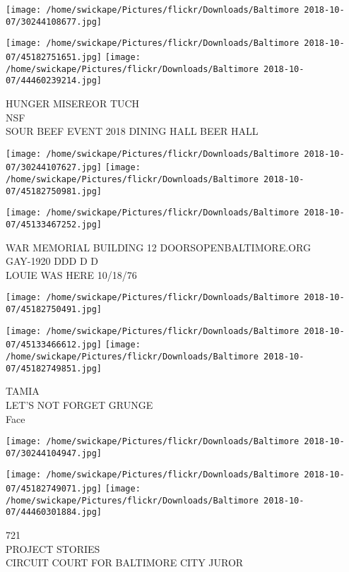 \documentclass[10pt,letterpaper]{article}
\begin{document}
\texttt{[image: /home/swickape/Pictures/flickr/Downloads/Baltimore 2018-10-07/30244108677.jpg]}

\vspace{0.25in}
\texttt{[image: /home/swickape/Pictures/flickr/Downloads/Baltimore 2018-10-07/45182751651.jpg]}
\texttt{[image: /home/swickape/Pictures/flickr/Downloads/Baltimore 2018-10-07/44460239214.jpg]}

HUNGER MISEREOR TUCH\\
NSF\\
SOUR BEEF EVENT 2018 DINING HALL BEER HALL\\
\pagebreak

\texttt{[image: /home/swickape/Pictures/flickr/Downloads/Baltimore 2018-10-07/30244107627.jpg]}
\texttt{[image: /home/swickape/Pictures/flickr/Downloads/Baltimore 2018-10-07/45182750981.jpg]}

\texttt{[image: /home/swickape/Pictures/flickr/Downloads/Baltimore 2018-10-07/45133467252.jpg]}

WAR MEMORIAL BUILDING 12 DOORSOPENBALTIMORE.ORG\\
GAY{-}1920 DDD D D\\
LOUIE WAS HERE 10/18/76\\
\pagebreak

\texttt{[image: /home/swickape/Pictures/flickr/Downloads/Baltimore 2018-10-07/45182750491.jpg]}

\vspace{0.25in}
\texttt{[image: /home/swickape/Pictures/flickr/Downloads/Baltimore 2018-10-07/45133466612.jpg]}
\texttt{[image: /home/swickape/Pictures/flickr/Downloads/Baltimore 2018-10-07/45182749851.jpg]}

TAMIA\\
LET'S NOT FORGET GRUNGE\\
Face\\
\pagebreak

\texttt{[image: /home/swickape/Pictures/flickr/Downloads/Baltimore 2018-10-07/30244104947.jpg]}

\vspace{0.25in}
\texttt{[image: /home/swickape/Pictures/flickr/Downloads/Baltimore 2018-10-07/45182749071.jpg]}
\texttt{[image: /home/swickape/Pictures/flickr/Downloads/Baltimore 2018-10-07/44460301884.jpg]}

721\\
PROJECT STORIES\\
CIRCUIT COURT FOR BALTIMORE CITY JUROR\\
\pagebreak
\end{document}
